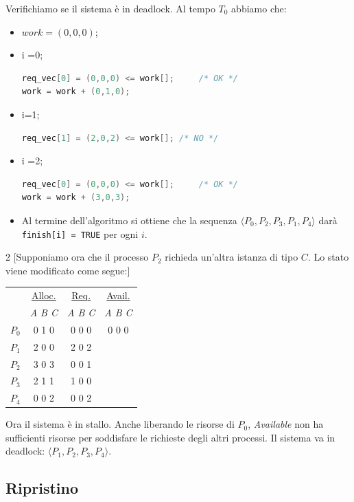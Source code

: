 \documentclass[a4paper,12pt, twoside]{report}
\begin{document}
Verifichiamo se il sistema \`e in deadlock. Al tempo $T_0$ abbiamo che:
\begin{itemize}
\item \colorbox{teal!40}{$work = (0,0,0)$};
\item \colorbox{green!40}{i =0}; 
\begin{lstlisting}[language=C]
req_vec[0] = (0,0,0) <= work[]; 	/* OK */
work = work + (0,1,0);
\end{lstlisting}
\item \colorbox{orange!40}{i=1};
\begin{lstlisting}[language=C]
req_vec[1] = (2,0,2) <= work[]; /* NO */
\end{lstlisting}
\item \colorbox{blue!40}{i =2}; 
\begin{lstlisting}[language=C]
req_vec[0] = (0,0,0) <= work[]; 	/* OK */
work = work + (3,0,3);
\end{lstlisting}
\item Al termine dell'algoritmo si ottiene che la sequenza $\langle P_0, P_2, P_3, P_1, P_4 \rangle$ dar\`a \texttt{finish[i] = TRUE} per ogni $i$.
\end{itemize}


\begin{multicols}{2} 
[Supponiamo ora che il processo $P_2$ richieda un'altra istanza di tipo $C$. Lo stato viene modificato come segue:]
\begin{center}
\begin{tabular}{||c | c  c  c || }
 & \underline{Alloc.} & \underline{Req.} & \underline{Avail.}  \\
 & \emph{A B C} & \emph{A B C} & \emph{A B C} \\
 $P_0$ & 0 1 0 & 0 0 0 &  0 0 0 \\
 $P_1$ &2 0 0 & 2 0 2 &  \\
 $P_2$ & 3 0 3 & \colorbox{red!40}{0 0 1} &  \\
 $P_3$ & 2 1 1 & 1 0 0 & \\
 $P_4$ & 0 0 2 & 0 0 2 & \\
 \end{tabular}
 \end{center}
Ora il sistema \`e in stallo. Anche liberando le risorse di $P_0$, \emph{Available} non ha sufficienti risorse per soddisfare le richieste degli altri processi. Il sistema va in deadlock: $\langle P_1, P_2, P_3, P_4 \rangle$.
\end{multicols}

\subsection{Ripristino}
\end{document}
